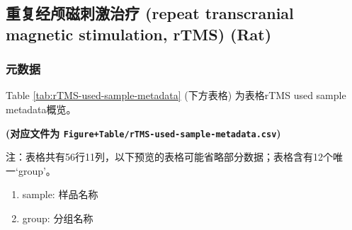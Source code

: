 \documentclass[
]{article}
\providecommand{\tightlist}{%
  \setlength{\itemsep}{0pt}\setlength{\parskip}{0pt}}
\begin{document}
\hypertarget{ux91cdux590dux7ecfux9885ux78c1ux523aux6fc0ux6cbbux7597-repeat-transcranial-magnetic-stimulation-rtms-rat}{%
\subsection{重复经颅磁刺激治疗 (repeat transcranial magnetic stimulation, rTMS) (Rat)}\label{ux91cdux590dux7ecfux9885ux78c1ux523aux6fc0ux6cbbux7597-repeat-transcranial-magnetic-stimulation-rtms-rat}}

\hypertarget{ux5143ux6570ux636e-2}{%
\subsubsection{元数据}\label{ux5143ux6570ux636e-2}}

Table \ref{tab:rTMS-used-sample-metadata} (下方表格) 为表格rTMS used sample metadata概览。

\textbf{(对应文件为 \texttt{Figure+Table/rTMS-used-sample-metadata.csv})}

\begin{center}\begin{tcolorbox}[colback=gray!10, colframe=gray!50, width=0.9\linewidth, arc=1mm, boxrule=0.5pt]注：表格共有56行11列，以下预览的表格可能省略部分数据；表格含有12个唯一`group'。
\end{tcolorbox}
\end{center}
\begin{center}\begin{tcolorbox}[colback=gray!10, colframe=gray!50, width=0.9\linewidth, arc=1mm, boxrule=0.5pt]\begin{enumerate}\tightlist
\item sample: 样品名称
\item group: 分组名称
\end{enumerate}\end{tcolorbox}
\end{center}
\end{document}
